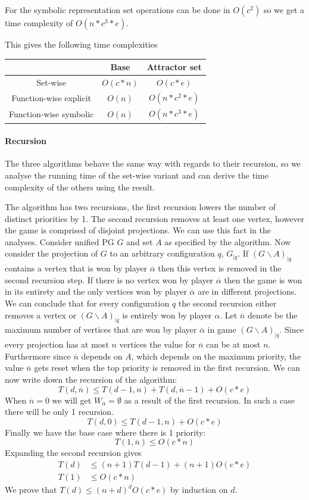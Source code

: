 For the symbolic representation set operations can be done in $O(c^2)$ so we get a time complexity of $O(n*c^3*e)$.

This gives the following time complexities\\
\begin{center}
	\begin{tabular}{|c|c|c|}
		\hline 
		& Base & Attractor set \\ 
		\hline 
		Set-wise & $O(c*n)$ & $O(c*e)$  \\ 
		\hline 
		Function-wise explicit & $O(n)$ &  $O(n*c^2*e)$ \\ 
		\hline 
		Function-wise symbolic & $O(n)$ &  $O(n* c^3*e)$ \\ 
		\hline 
	\end{tabular} 
\end{center}

\paragraph{Recursion} The three algorithms behave the same way with regards to their recursion, so we analyse the running time of the set-wise variant and can derive the time complexity of the others using the result.

The algorithm has two recursions, the first recursion lowers the number of distinct priorities by 1. The second recursion removes at least one vertex, however the game is comprised of disjoint projections. We can use this fact in the analyses. Consider unified PG $G$ and set $A$ as specified by the algorithm. Now consider the projection of $G$ to an arbitrary configuration $q$, $G_{|q}$. If $(G\backslash A)_{|q}$ contains a vertex that is won by player $\overline{\alpha}$ then this vertex is removed in the second recursion step. If there is no vertex won by player $\overline{\alpha}$ then the game is won in its entirety and the only vertices won by player $\overline{\alpha}$ are in different projections. We can conclude that for every configuration $q$ the second recursion either removes a vertex or $(G\backslash A)_{|q}$ is entirely won by player $\alpha$. Let $\overline{n}$ denote be the maximum number of vertices that are won by player $\overline{\alpha}$ in game $(G\backslash A)_{|q}$. Since every projection has at most $n$ vertices the value for $\overline{n}$ can be at most $n$. Furthermore since $\overline{n}$ depends on $A$, which depends on the maximum priority, the value $\overline{n}$ gets reset when the top priority is removed in the first recursion. We can now write down the recursion of the algorithm:
\[ T(d,\overline{n}) \leq T(d-1,n) + T(d, \overline{n} - 1) + O(c*e) \]
When $\overline{n} = 0$ we will get $W_{\overline{\alpha}} = \emptyset$ as a result of the first recursion. In such a case there will be only 1 recursion.
\[ T(d,0) \leq T(d-1,n) + O(c*e) \]
Finally we have the base case where there is 1 priority:
\[ T(1, \overline{n}) \leq O(c*n) \]
Expanding the second recursion gives
\begin{align*}
T(d) &\leq (n+1)T(d-1) + (n+1)O(c*e)\\
T(1) &\leq O(c*n)
\end{align*}
We prove that $T(d) \leq (n+d)^dO(c*e)$ by induction on $d$.

